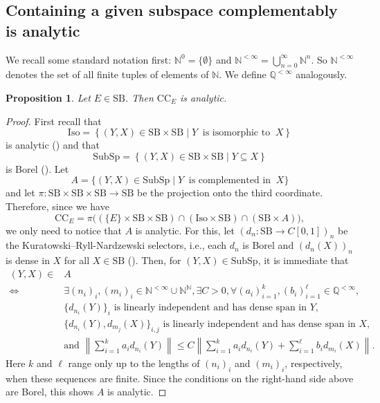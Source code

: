 \documentclass[letterpaper]{amsart}
\numberwithin{equation}{section}
\newtheorem{proposition}[theorem]{Proposition}
\theoremstyle{definition}
\newcommand{\N}{{\mathbb{N}}}
\newcommand{\Q}{{\mathbb{Q}}}
\newcommand{\SB}{\mathrm{SB}}
\begin{document}
\subsection{Containing a given subspace complementably is analytic}
We recall some standard notation first: $\N^0=\{\emptyset\}$ and  $\N^{<\infty}=\bigcup_{n=0}^\infty \N^n$. So $\N^{<\infty}$  denotes the set of all finite tuples of elements of  $\N$. We define $\Q^{<\infty}$ analogously.


\begin{proposition}\label{Prop.Containing.Complemented.is.Analytic}
Let $E\in \SB$. Then $\mathrm{CC}_E$ is analytic.
\end{proposition}

\begin{proof}
    First recall that 
    \[\mathrm{Iso}=\left\{(Y,X)\in \SB\times \SB\mid Y\ \text{ is isomorphic to }\ X \right\}\]
    is analytic (\cite[Section 2.1.1(P7)]{Dodos2010LectureNotes}) and that 
    \[\mathrm{SubSp}=\left\{(Y,X)\in \SB\times\SB\mid Y\subseteq X\right\}\]
    is Borel  (\cite[Section 2.1.1(P1)]{Dodos2010LectureNotes}). Let 
    \[A=\{(Y,X)\in \mathrm{SubSp}\mid Y\ \text{ is complemented in  }\  X\}\] and let $\pi\colon \SB\times \SB\times \SB\to \SB$ be the projection onto the third coordinate. Therefore, since we have  
    \[\mathrm{CC}_E=\pi\Big((\{E\}\times \SB\times \SB)\cap( \mathrm{Iso}\times \SB)\cap (\SB\times A)\Big),\]
     we only need to notice that $A$ is analytic. For this, let $(d_n\colon \SB\to C[0,1])_n$ be the Kuratowski--Ryll-Nardzewski selectors, i.e., each $d_n$ is Borel and $(d_n(X))_n$ is dense in $X$ for all $X\in \SB$ (\cite[12.13]{KechrisBook1995}).
 Then, for $(Y,X)\in \mathrm{SubSp}$, it is immediate that
\begin{align*}(Y,X)
 \in & A\ \\
 \Leftrightarrow\ &\exists (n_i)_i,(m_i)_i\in \N^{<\infty}\cup \N^\N, \exists C>0, \forall (a_i)_{i=1}^k,(b_i)_{i=1}^\ell\in \Q^{<\infty},\\
 &\{d_{n_i}(Y)\}_{i} \text{ is linearly independent and has dense span in }Y,\\
  &\{d_{n_i}(Y),d_{m_j}(X)\}_{i,j} \text{ is linearly independent and has dense span in }X,\\
  &\text{and }\left\|\sum_{i=1}^ka_id_{n_i}(Y)\right\|\leq C\left\|\sum_{i=1}^ka_id_{n_i}(Y)+\sum_{i=1}^\ell b_id_{m_i}(X)\right\|.
 \end{align*}
 Here $k$ and $\ell$ range only up to the lengths of $(n_i)_i$ and $(m_i)_i$, respectively, when these sequences are finite. Since the conditions on the right-hand side above are   Borel, this shows $A$ is analytic. 
\end{proof}
\end{document}
